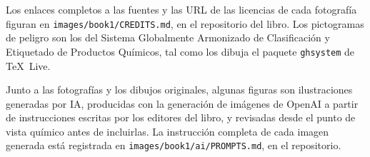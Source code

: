 Los enlaces completos a las fuentes y las URL de las licencias de cada
fotografía figuran en \texttt{images/book1/CREDITS.md}, en el repositorio
del libro. Los pictogramas de peligro son los del Sistema Globalmente
Armonizado de Clasificación y Etiquetado de Productos Químicos, tal como
los dibuja el paquete \texttt{ghsystem} de \TeX\ Live.

\bigskip
Junto a las fotografías y los dibujos originales, algunas figuras son
ilustraciones generadas por IA, producidas con la generación de imágenes
de OpenAI a partir de instrucciones escritas por los editores del libro,
y revisadas desde el punto de vista químico antes de incluirlas. La
instrucción completa de cada imagen generada está registrada en
\texttt{images/book1/ai/PROMPTS.md}, en el repositorio.
\clearpage
